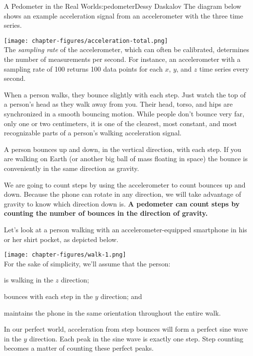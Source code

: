 \begin{aosachapter}{A Pedometer in the Real World}{s:pedometer}{Dessy Daskalov}
The diagram below shows an example acceleration signal from an
accelerometer with the three time series.

\texttt{[image: chapter-figures/acceleration-total.png]}\\ The
\emph{sampling rate} of the accelerometer, which can often be
calibrated, determines the number of measurements per second. For
instance, an accelerometer with a sampling rate of 100 returns 100 data
points for each $x$, $y$, and $z$ time series every second.

\label{lets-talk-about-a-walk}

When a person walks, they bounce slightly with each step. Just watch the
top of a person's head as they walk away from you. Their head, torso,
and hips are synchronized in a smooth bouncing motion. While people
don't bounce very far, only one or two centimeters, it is one of the
clearest, most constant, and most recognizable parts of a person's
walking acceleration signal.

A person bounces up and down, in the vertical direction, with each step.
If you are walking on Earth (or another big ball of mass floating in
space) the bounce is conveniently in the same direction as gravity.

We are going to count steps by using the accelerometer to count bounces
up and down. Because the phone can rotate in any direction, we will take
advantage of gravity to know which direction down is. \textbf{A
pedometer can count steps by counting the number of bounces in the
direction of gravity.}

Let's look at a person walking with an accelerometer-equipped smartphone
in his or her shirt pocket, as depicted below.

\texttt{[image: chapter-figures/walk-1.png]}\\ For the sake of
simplicity, we'll assume that the person:

\begin{aosaitemize}

\item
  is walking in the $z$ direction;
\item
  bounces with each step in the $y$ direction; and
\item
  maintains the phone in the same orientation throughout the entire
  walk.
\end{aosaitemize}

In our perfect world, acceleration from step bounces will form a perfect
sine wave in the $y$ direction. Each peak in the sine wave is exactly
one step. Step counting becomes a matter of counting these perfect
peaks.


\end{aosachapter}
